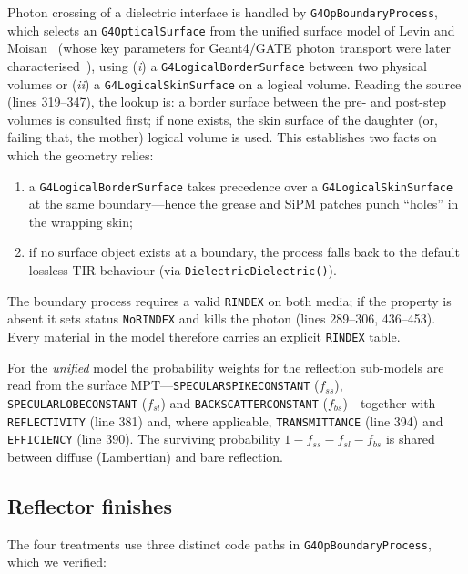 \documentclass[11pt,a4paper]{article}
\begin{document}
Photon crossing of a dielectric interface is handled by
\texttt{G4OpBoundaryProcess}, which selects an \texttt{G4OpticalSurface} from
the unified surface model of Levin and Moisan~\cite{Levin1996} (whose key
parameters for Geant4/GATE photon transport were later
characterised~\cite{Nilsson2015}), using
(\emph{i}) a \texttt{G4LogicalBorderSurface} between two physical volumes or
(\emph{ii}) a \texttt{G4LogicalSkinSurface} on a logical volume. Reading the
source (lines 319--347), the lookup is: a border surface between the pre- and
post-step volumes is consulted first; if none exists, the skin surface of the
daughter (or, failing that, the mother) logical volume is used. This establishes
two facts on which the geometry relies:
\begin{enumerate}
  \item a \texttt{G4LogicalBorderSurface} takes precedence over a
        \texttt{G4LogicalSkinSurface} at the same boundary---hence the grease
        and SiPM patches punch ``holes'' in the wrapping skin;
  \item if no surface object exists at a boundary, the process falls back to
        the default lossless TIR behaviour (via \texttt{DielectricDielectric()}).
\end{enumerate}

The boundary process requires a valid \texttt{RINDEX} on both media; if the
property is absent it sets status \texttt{NoRINDEX} and kills the photon
(lines 289--306, 436--453). Every material in the model therefore carries an
explicit \texttt{RINDEX} table.

For the \emph{unified} model the probability weights for the reflection
sub-models are read from the surface MPT---\texttt{SPECULARSPIKECONSTANT}
($f_{ss}$), \texttt{SPECULARLOBECONSTANT} ($f_{sl}$) and
\texttt{BACKSCATTERCONSTANT} ($f_{bs}$)---together with \texttt{REFLECTIVITY}
(line 381) and, where applicable, \texttt{TRANSMITTANCE} (line 394) and
\texttt{EFFICIENCY} (line 390). The surviving probability
$1 - f_{ss} - f_{sl} - f_{bs}$ is shared between diffuse (Lambertian) and bare
reflection.

\subsection{Reflector finishes}

The four treatments use three distinct code paths in
\texttt{G4OpBoundaryProcess}, which we verified:
\end{document}
